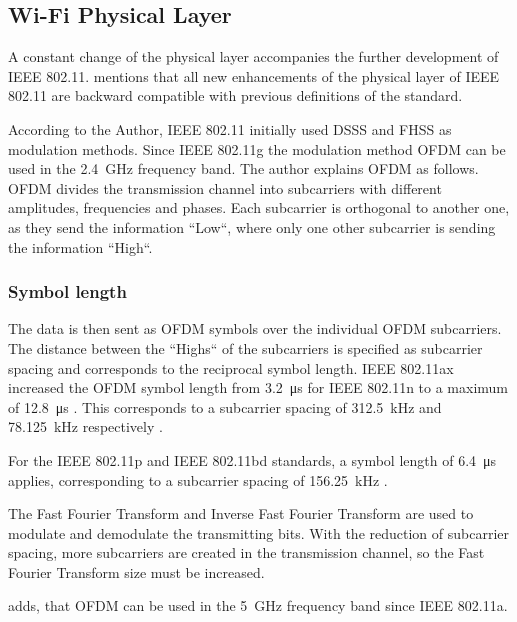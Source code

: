 \subsection*{Wi-Fi Physical Layer}
A constant change of the physical layer accompanies the further development of IEEE 802.11.
\textcite{sauter_wireless_2022} mentions that all new enhancements of the physical layer of IEEE 802.11 are backward
compatible with previous definitions of the standard.

According to the Author, IEEE 802.11 initially used DSSS and FHSS as modulation methods.
Since IEEE 802.11g the modulation method \ac{OFDM} can be used in the \SI{2.4}{\giga\hertz} frequency band.
The author explains \ac{OFDM} as follows. \ac{OFDM} divides the transmission channel into subcarriers with different
amplitudes, frequencies and phases.
Each subcarrier is orthogonal to another one, as they send the information ``Low``,
where only one other subcarrier is sending the information ``High``.


\subsubsection*{Symbol length}
The data is then sent as \ac{OFDM} symbols over the individual \ac{OFDM} subcarriers.
The distance between the ``Highs`` of the subcarriers is specified as subcarrier spacing and corresponds to the reciprocal
symbol length.
IEEE 802.11ax increased the \ac{OFDM} symbol length from \SI{3.2}{\micro\second} for IEEE 802.11n to a maximum of \SI{12.8}{\micro\second} \cite{sauter_wireless_2022}.
This corresponds to a subcarrier spacing of \SI{312.5}{\kilo\hertz} and \SI{78.125}{\kilo\hertz} respectively \cite{sauter_wireless_2022}.

For the IEEE 802.11p and IEEE 802.11bd standards, a symbol length of \SI{6.4}{\micro\second} applies, corresponding to a subcarrier spacing of \SI{156.25}{\kilo\hertz} \cite{jacob_system-level_2020}.

The Fast Fourier Transform and Inverse Fast Fourier Transform are used to modulate and demodulate the transmitting bits.
With the reduction of subcarrier spacing, more subcarriers are created in the transmission channel,
so the Fast Fourier Transform size must be increased.

\textcite{kauffels_wireless_2002} adds, that \ac{OFDM} can be used in the \SI{5}{\giga\hertz} frequency band since IEEE 802.11a.
